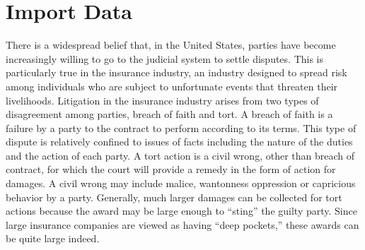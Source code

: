 \documentclass[]{book}
\newenvironment{Shaded}{\begin{snugshade}}{\end{snugshade}}
\newcommand{\CharTok}[1]{\textcolor[rgb]{0.31,0.60,0.02}{#1}}
\newcommand{\CommentTok}[1]{\textcolor[rgb]{0.56,0.35,0.01}{\textit{#1}}}
\newcommand{\DataTypeTok}[1]{\textcolor[rgb]{0.13,0.29,0.53}{#1}}
\newcommand{\DecValTok}[1]{\textcolor[rgb]{0.00,0.00,0.81}{#1}}
\newcommand{\KeywordTok}[1]{\textcolor[rgb]{0.13,0.29,0.53}{\textbf{#1}}}
\newcommand{\NormalTok}[1]{#1}
\newcommand{\OperatorTok}[1]{\textcolor[rgb]{0.81,0.36,0.00}{\textbf{#1}}}
\newcommand{\OtherTok}[1]{\textcolor[rgb]{0.56,0.35,0.01}{#1}}
\newcommand{\StringTok}[1]{\textcolor[rgb]{0.31,0.60,0.02}{#1}}
\begin{document}
\hypertarget{import-data-8}{%
\section{Import Data}\label{import-data-8}}

\begin{Shaded}
\end{Shaded}

There is a widespread belief that, in the United States, parties have become increasingly willing to go to the judicial system to settle disputes. This is particularly true in the insurance industry, an industry designed to spread risk among individuals who are subject to unfortunate events that threaten their livelihoods. Litigation in the insurance industry arises from two types of disagreement among parties, breach of faith and tort. A breach of faith is a failure by a party to the contract to perform according to its terms. This type of dispute is relatively confined to issues of facts including the nature of the duties and the action of each party. A tort action is a civil wrong, other than breach of contract, for which the court will provide a remedy in the form of action for damages. A civil wrong may include malice, wantonness oppression or capricious behavior by a party. Generally, much larger damages can be collected for tort actions because the award may be large enough to ``sting'' the guilty party. Since large insurance companies are viewed as having ``deep pockets,'' these awards can be quite large indeed.
\end{document}
